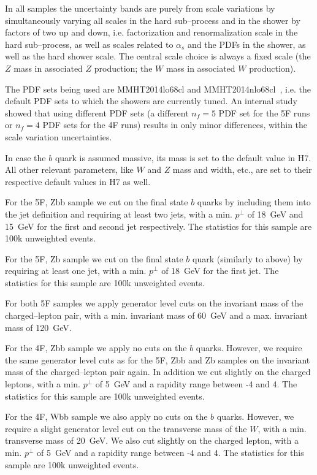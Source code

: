 \documentclass[11pt]{cernrep}
\newcommand{\Herwig}{H\protect\scalebox{0.8}{ERWIG}7\xspace}
\begin{document}
\medskip

In all samples the uncertainty bands are purely from scale variations by
simultaneously varying all scales in the hard sub--process and in the shower by
factors of two up and down, i.e. factorization and renormalization scale in the
hard sub--process, as well as scales related to $\alpha_s$ and the PDFs
in the shower, as well as the hard shower scale. The central scale
choice is always a fixed scale (the $Z$ mass in associated $Z$ production; the
$W$ mass in associated $W$ production).

The PDF sets being used are MMHT2014lo68cl and
MMHT2014nlo68cl~\cite{Harland-Lang:2014zoa}, i.e. the default PDF sets
to which the showers are currently tuned. An internal study showed that using
different PDF sets (a different $n_f\!\!=\!\!5$ PDF set for the 5F runs or
$n_f\!\!=\!\!4$ PDF sets for the 4F runs) results in only minor differences,
within the scale variation uncertainties.

In case the $b$ quark is assumed massive, its mass is set to the default value
in \Herwig. All other relevant parameters, like $W$ and $Z$ mass and width,
etc., are set to their respective default values in \Herwig as well.

For the 5F, Zbb sample we cut on the final state $b$ quarks by including them
into the jet definition and requiring at least two jets,
with a min. $p^\bot$ of 18~GeV and 15~GeV for the first and second jet
respectively. The statistics for this sample are 100k unweighted events.

For the 5F, Zb sample we cut on the final state $b$ quark (similarly to above)
by requiring at least one jet, with a min. $p^\bot$ of 18~GeV for the first jet.
The statistics for this sample are 100k unweighted events.

For both 5F samples we apply generator level cuts on the invariant mass of the
charged--lepton pair, with a min. invariant mass of 60~GeV and a max. invariant
mass of 120~GeV.

For the 4F, Zbb sample we apply no cuts on the $b$ quarks. However, we require
the same generator level cuts as for the 5F, Zbb and Zb samples on the invariant
mass of the charged--lepton pair again. In addition we cut slightly on the
charged leptons, with a min. $p^\bot$ of 5~GeV and a rapidity range between -4
and 4. The statistics for this sample are 100k unweighted events.

For the 4F, Wbb sample we also apply no cuts on the $b$ quarks. However, we
require a slight generator level cut on the transverse mass of the $W$, with a
min. transverse mass of 20~GeV. We also cut slightly on the charged lepton, with
a min. $p^\bot$ of 5~GeV and a rapidity range between -4 and 4. The statistics
for this sample are 100k unweighted events.
\end{document}

